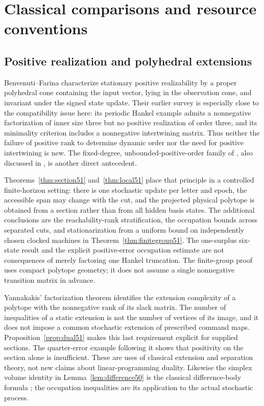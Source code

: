 \section{Classical comparisons and resource conventions}\label{sec:resources51}
\subsection{Positive realization and polyhedral extensions}
Benvenuti--Farina \cite[Theorem 2]{BF04} characterize stationary
positive realizability by a proper polyhedral cone containing the
input vector, lying in the observation cone, and invariant under the
signed state update. Their earlier survey
\cite[Section 3, Example 4 and Theorem 2]{BF03} is especially close
to the compatibility issue here: its periodic Hankel example admits
a nonnegative factorization of inner size three but no positive
realization of order three, and its minimality criterion includes a
nonnegative intertwining matrix. Thus neither the failure of positive
rank to determine dynamic order nor the need for positive
intertwining is new. The fixed-degree, unbounded-positive-order family
of \cite{BF99}, also discussed in \cite[Section 2]{BF03}, is another
direct antecedent.

Theorems~\ref{thm:section51} and~\ref{thm:local51} place that
principle in a controlled finite-horizon setting: there is one
stochastic update per letter and epoch, the accessible span may
change with the cut, and the projected physical polytope is obtained
from a section rather than from all hidden basis states. The
additional conclusions are the reachability-rank stratification,
the occupation bounds across separated cuts, and stationarization
from a uniform bound on independently chosen clocked machines in
Theorem~\ref{thm:finitegroup51}. The one-surplus six-state result and
the explicit positive-error occupation estimate are not consequences
of merely factoring one Hankel truncation. The finite-group proof
uses compact polytope geometry; it does not assume a single
nonnegative transition matrix in advance.

Yannakakis' factorization theorem \cite{Yannakakis} identifies the
extension complexity of a polytope with the nonnegative rank of its
slack matrix. The number of inequalities of a static extension is
not the number of vertices of its image, and it does not impose a
common stochastic extension of prescribed command maps.
Proposition~\ref{prop:dual51} makes this last requirement explicit
for supplied sections. The quarter-error example following it shows
that positivity on the section alone is insufficient. These are
uses of classical extension and separation theory, not new claims
about linear-programming duality. Likewise the simplex
volume identity in Lemma~\ref{lem:difference50} is the classical
difference-body formula \cite{RogersShephard}; the occupation
inequalities are its application to the actual stochastic process.

